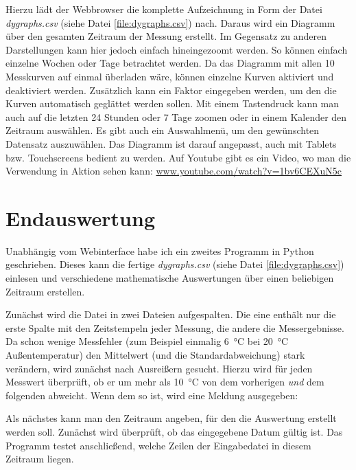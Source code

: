 Hierzu lädt der Webbrowser die komplette Aufzeichnung in Form der Datei \emph{dygraphs.csv} (siehe Datei \ref{file:dygraphs.csv}) nach. Daraus wird ein Diagramm über den gesamten Zeitraum der Messung erstellt. Im Gegensatz zu anderen Darstellungen kann hier jedoch einfach hineingezoomt werden. So können einfach einzelne Wochen oder Tage betrachtet werden. Da das Diagramm mit allen 10 Messkurven auf einmal überladen wäre, können einzelne Kurven aktiviert und deaktiviert werden. Zusätzlich kann ein Faktor eingegeben werden, um den die Kurven automatisch geglättet werden sollen. Mit einem Tastendruck kann man auch auf die letzten 24 Stunden oder 7 Tage zoomen oder in einem Kalender den Zeitraum auswählen. Es gibt auch ein Auswahlmenü, um den gewünschten Datensatz auszuwählen. Das Diagramm ist darauf angepasst, auch mit Tablets bzw. Touchscreens bedient zu werden.
Auf Youtube gibt es ein Video, wo man die Verwendung in Aktion sehen kann: \href{https://www.youtube.com/watch?v=1bv6CEXuN5c}{www.youtube.com/watch?v=1bv6CEXuN5c}

\section{Endauswertung}
\label{sec:Endauswertung}

Unabhängig vom Webinterface habe ich ein zweites Programm in \gls{Python} geschrieben. Dieses kann die fertige \emph{dygraphs.csv} (siehe Datei \ref{file:dygraphs.csv}) einlesen und verschiedene mathematische Auswertungen über einen beliebigen Zeitraum erstellen.

Zunächst wird die Datei in zwei Dateien aufgespalten. Die eine enthält nur die erste Spalte mit den Zeitstempeln jeder Messung, die andere die Messergebnisse. Da schon wenige Messfehler (zum Beispiel einmalig \SI{6}{\degreeCelsius} bei \SI{20}{\degreeCelsius} Außentemperatur) den Mittelwert (und die \gls{Standardabweichung}) stark verändern, wird zunächst nach Ausreißern gesucht. Hierzu wird für jeden Messwert überprüft, ob er um mehr als \SI{10}{\degreeCelsius} von dem vorherigen \emph{und} dem folgenden abweicht. Wenn dem so ist, wird eine Meldung ausgegeben:


Als nächstes kann man den Zeitraum angeben, für den die Auswertung erstellt werden soll. Zunächst wird überprüft, ob das eingegebene Datum gültig ist. Das Programm testet anschließend, welche Zeilen der Eingabedatei in diesem Zeitraum liegen.


